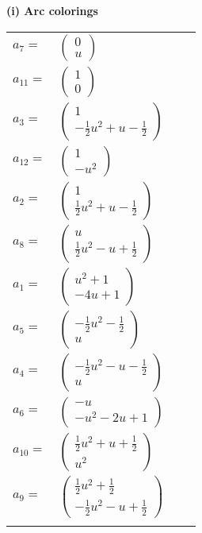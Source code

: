 \documentclass[1p]{elsarticle_modified}
\theoremstyle{definition}
\begin{document}
\flushleft \textbf{(i) Arc colorings}\\
\begin{tabular}{m{7pt} m{180pt} m{7pt} m{180pt} }
\flushright $a_{7}=$&$\begin{pmatrix}0\\u\end{pmatrix}$ \\
\flushright $a_{11}=$&$\begin{pmatrix}1\\0\end{pmatrix}$ \\
\flushright $a_{3}=$&$\begin{pmatrix}1\\-\frac{1}{2} u^2+u-\frac{1}{2}\end{pmatrix}$ \\
\flushright $a_{12}=$&$\begin{pmatrix}1\\- u^2\end{pmatrix}$ \\
\flushright $a_{2}=$&$\begin{pmatrix}1\\\frac{1}{2} u^2+u-\frac{1}{2}\end{pmatrix}$ \\
\flushright $a_{8}=$&$\begin{pmatrix}u\\\frac{1}{2} u^2- u+\frac{1}{2}\end{pmatrix}$ \\
\flushright $a_{1}=$&$\begin{pmatrix}u^2+1\\-4 u+1\end{pmatrix}$ \\
\flushright $a_{5}=$&$\begin{pmatrix}-\frac{1}{2} u^2-\frac{1}{2}\\u\end{pmatrix}$ \\
\flushright $a_{4}=$&$\begin{pmatrix}-\frac{1}{2} u^2- u-\frac{1}{2}\\u\end{pmatrix}$ \\
\flushright $a_{6}=$&$\begin{pmatrix}- u\\- u^2-2 u+1\end{pmatrix}$ \\
\flushright $a_{10}=$&$\begin{pmatrix}\frac{1}{2} u^2+u+\frac{1}{2}\\u^2\end{pmatrix}$ \\
\flushright $a_{9}=$&$\begin{pmatrix}\frac{1}{2} u^2+\frac{1}{2}\\-\frac{1}{2} u^2- u+\frac{1}{2}\end{pmatrix}$\\&\end{tabular}
\end{document}
